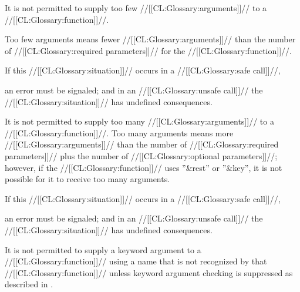 \endsubsubsubsection%

\endsubsubsection%


It is not permitted to supply too few //[[CL:Glossary:arguments]]// to a //[[CL:Glossary:function]]//.

Too few arguments means fewer //[[CL:Glossary:arguments]]// than the number of //[[CL:Glossary:required parameters]]//  for the //[[CL:Glossary:function]]//.


If this //[[CL:Glossary:situation]]// occurs in a //[[CL:Glossary:safe call]]//,

an error  must be signaled; and in an //[[CL:Glossary:unsafe call]]// the //[[CL:Glossary:situation]]// has undefined consequences.


\endsubsubsection%


It is not permitted to supply too many //[[CL:Glossary:arguments]]// to a //[[CL:Glossary:function]]//. Too many arguments means more //[[CL:Glossary:arguments]]// than the number of //[[CL:Glossary:required parameters]]// plus the number of //[[CL:Glossary:optional parameters]]//; however, if the //[[CL:Glossary:function]]//  uses ''&rest'' or ''&key'', it is not possible for it to receive too many arguments.


If this //[[CL:Glossary:situation]]// occurs in a //[[CL:Glossary:safe call]]//,

an error  must be signaled; and in an //[[CL:Glossary:unsafe call]]// the //[[CL:Glossary:situation]]// has undefined consequences.


\endsubsubsection%

 

It is not permitted to supply a keyword argument to a //[[CL:Glossary:function]]// using a name that is not recognized by that //[[CL:Glossary:function]]//  unless keyword argument checking is suppressed as described in \secref\SuppressingKeyArgChecks.

